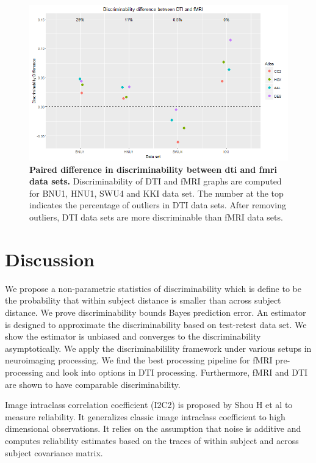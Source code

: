 \documentclass{article}
\begin{document}
\begin{figure}[ht!]
	\includegraphics[width=\linewidth]{../Figs/dti_mri_differ.png}
	\caption{{ \bf Paired difference in discriminability between dti and fmri data sets.} Discriminability of DTI and fMRI graphs are computed for BNU1, HNU1, SWU4 and KKI data set. The number at the top indicates the percentage of outliers in DTI data sets. After removing outliers, DTI data sets are more discriminable than fMRI data sets.}
	\label{fig:7}
\end{figure}

\section{Discussion}

 We propose a non-parametric statistics of discriminability which is define to be the probability that within subject distance is smaller than across subject distance.  We prove discriminability bounds Bayes prediction error. An estimator is designed to approximate the discriminability based on test-retest data set. We show the estimator is unbiased and converges to the discriminability asymptotically. We apply the discriminabilility framework under various setups in neuroimaging processing. We find the best processing pipeline for fMRI pre-processing and look into options in DTI processing. Furthermore, fMRI and DTI are shown to have comparable discriminability.

 Image intraclass correlation coefficient (I2C2) is proposed by Shou H et al to measure reliability. It generalizes classic image intraclass coefficient to high dimensional observations. It relies on the assumption that noise is additive and computes reliability estimates based on the traces of within subject and across subject covariance matrix. 
\end{document}
